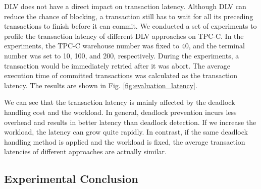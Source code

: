 \documentclass[conference]{IEEEtran}
\begin{document}
  DLV does not have a direct impact on transaction latency.
  Although DLV can reduce the chance of blocking, a transaction still has to wait for all its preceding transactions to finish before it can commit.
  We conducted a set of experiments to profile the transaction latency of different DLV approaches on TPC-C. 
  In the experiments, the TPC-C warehouse number was fixed to 40, and the terminal number was set to 10, 100, and 200, respectively.
  During the experiments, a transaction would be immediately retried after it was abort.
  The average execution time of committed transactions was calculated as the transaction latency. The results are shown in Fig. \ref{fig:evaluation_latency}.
  
  We can see that the transaction latency is mainly affected by the deadlock handling cost and the workload.
  In general, deadlock prevention incurs less overhead and results in better latency than deadlock detection. If we increase the workload, the latency can grow quite rapidly.
  In contrast, if the same deadlock handling method is applied and the workload is fixed, the average transaction latencies of different approaches are actually similar. 

\subsection{Experimental Conclusion}
\end{document}
